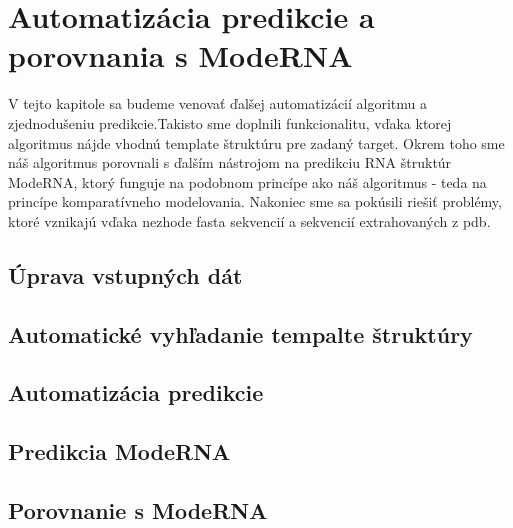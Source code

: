 \chapter{Automatizácia predikcie a porovnania s ModeRNA}

V tejto kapitole sa budeme venovať ďalšej automatizácií algoritmu a zjednodušeniu predikcie.Takisto sme doplnili funkcionalitu, vďaka ktorej algoritmus nájde vhodnú template štruktúru pre zadaný target. Okrem toho sme náš algoritmus porovnali s ďalším nástrojom na predikciu RNA štruktúr ModeRNA, ktorý funguje na podobnom princípe ako náš algoritmus - teda na princípe komparatívneho modelovania. Nakoniec sme sa pokúsili riešiť problémy, ktoré vznikajú vďaka nezhode fasta sekvencií a sekvencií extrahovaných z pdb.

\section{Úprava vstupných dát}


\section{Automatické vyhľadanie tempalte štruktúry}


\section{Automatizácia predikcie}


\section{Predikcia ModeRNA}


\section{Porovnanie s ModeRNA}